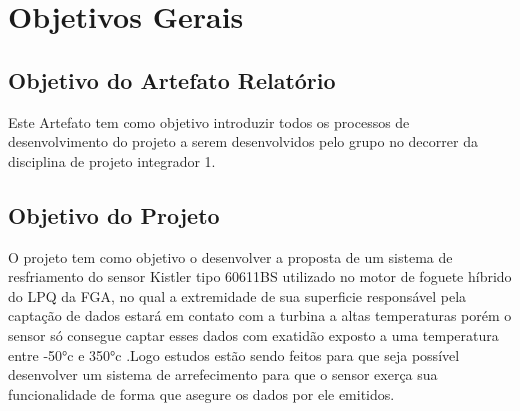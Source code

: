 \chapter{Objetivos Gerais}
\section{Objetivo do Artefato Relatório}
Este Artefato tem como objetivo introduzir todos os processos de desenvolvimento do projeto a serem desenvolvidos pelo grupo no decorrer  da disciplina  de projeto integrador 1.
\section{Objetivo do Projeto}
O projeto tem como objetivo o desenvolver a proposta de um sistema de resfriamento do sensor Kistler tipo 60611BS utilizado no motor de foguete híbrido do LPQ da FGA, no qual a extremidade de sua superficie responsável pela captação de dados estará em contato com a turbina a altas temperaturas porém o sensor só consegue captar esses dados com exatidão exposto a uma temperatura entre -50°c e 350°c .Logo estudos estão sendo feitos para que seja possível desenvolver um sistema de arrefecimento para que o sensor exerça sua funcionalidade de forma que asegure os dados por ele emitidos.

